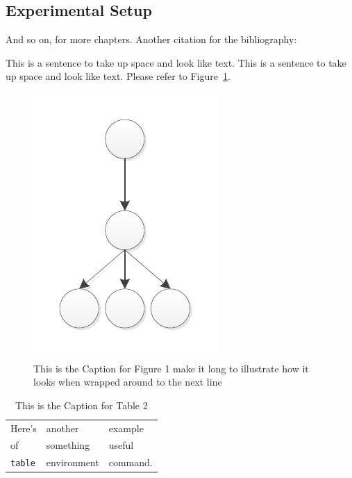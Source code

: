 \documentclass{thesis}
\begin{document}
\subsection{Experimental Setup}
And so on, for more chapters.
Another citation for the bibliography:\cite{anotherbook}

   This is a sentence to take up space and look like text.
   This is a sentence to take up space and look like text.
   Please refer to Figure~\ref{Figure 1}.  %

 
\begin{figure}
\centering
\vspace{2.0in} 
\includegraphics{Drawing4}  
\caption{This is the Caption for Figure 1 make it long to illustrate
   how it looks when wrapped around to the next line}
\label{Figure 1}  %
\end{figure}


\begin{table}
\caption{This is the Caption for Table 2}
\label{mytable}
\begin{center}
\begin{tabular}{lll}
Here's	& another 	& example \\
of		& something	& useful \\
\verb+table+ & environment & command. \end{tabular}
\end{center}
\end{table}
\end{document}
